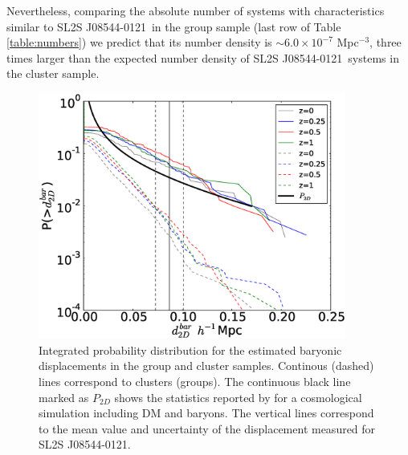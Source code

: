 \documentclass{emulateapj}
\newcommand{\bullg}{SL2S J08544-0121}
\begin{document}
Nevertheless, comparing the absolute number of systems with
characteristics similar to \bullg\ in the group sample
(last row of Table \ref{table:numbers}) we predict that its number
density is $\sim 6.0\times 10^{-7}$ Mpc$^{-3}$, three times larger
than the expected number density of \bullg\ systems in the cluster
sample. 




\begin{figure}
\begin{center}
\includegraphics[width=0.9\textwidth]{figure_3.eps}
\end{center}
\caption{Integrated probability distribution for the estimated
  baryonic displacements in the group and cluster samples. Continous (dashed)
  lines correspond to clusters (groups). The continuous black line
  marked as $P_{2D}$ shows the statistics reported by
  \citet{ForeroRomero2010} for a cosmological simulation including DM
  and baryons. The vertical lines correspond to the mean value and
  uncertainty of the displacement measured for \bullg.} 
\label{fig:baryonic_displacements}
\end{figure}
\end{document}
